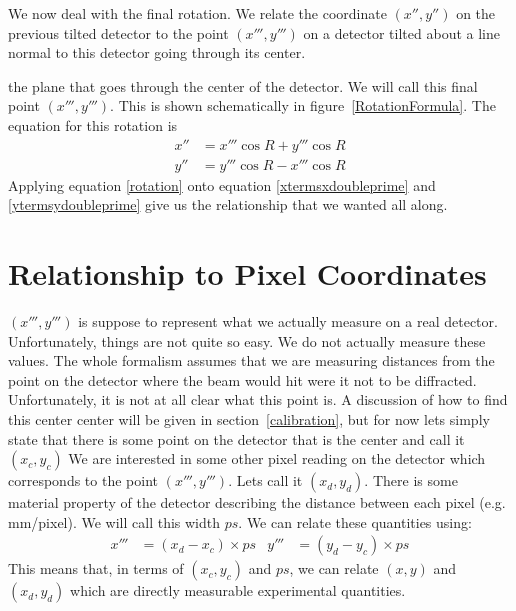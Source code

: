 \begin{SCfigure}[1][htbp]
    \centering
    
    \caption{Here, we take a point on a plane rotated
    by angle $\beta$ about $\hat y$ and by angle
    $\alpha$ about $\hat x'$. We then rotated this point
    about a line normal to the plane going through the
    origin by angle $R$. Rotating the point is 
    equivalent to rotating the plane.}
    \label{RotationFormula}
\end{SCfigure}

We now deal with the final rotation. We relate
the coordinate $(x'',y'')$ on the previous tilted 
detector to the point $(x''',y''')$ on a detector 
tilted about a line normal to this detector going 
through its center.

the plane that goes through the center of the
detector. We will call this final
point $(x''',y''')$. This is shown schematically 
in figure~\ref{RotationFormula}. The equation for 
this rotation is
\begin{align}\label{rotation}
    x''&=x'''\cos R + y'''\cos R\\
    y''&=y'''\cos R - x'''\cos R
\end{align}
Applying equation \ref{rotation} onto equation 
\ref{xtermsxdoubleprime} and \ref{ytermsydoubleprime}
give us the relationship that we wanted all along.

\section{Relationship to Pixel Coordinates}

$(x''',y''')$ is suppose to represent what we actually
measure on a real detector. Unfortunately, things are
not quite so easy. We do not actually measure these
values. The whole formalism assumes that we are 
measuring distances from the point on the
detector where the beam would hit were it not to be
diffracted. Unfortunately, it is not at all clear
what this point is. A discussion of how to find
this center center will
be given in section~\ref{calibration}, but for now
lets simply state that there is some point on the detector
that is the center and call it $(x_c,y_c)$ 
We are interested in some other pixel reading
on the detector which corresponds to the point
$(x''',y''')$. Lets call it $(x_d,y_d)$. 
There is some material property of the detector 
describing the distance between each pixel
(e.g. \unit[1000]{mm/pixel}). We will call
this width $ps$. We can relate these quantities 
using:
\begin{align}\label{conversionToPixels}
    x'''&=(x_d-x_c) \times ps &
    y'''&=(y_d-y_c) \times ps
\end{align}
This means that, in terms of $(x_c,y_c)$ and $ps$,
we can relate $(x,y)$ and $(x_d,y_d)$ which are
directly measurable experimental quantities.

